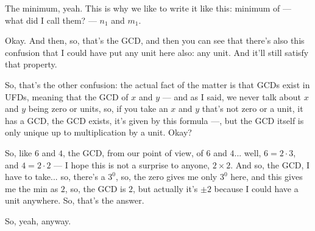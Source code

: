 \begin{speech}[01:24:48 - 01:25:34]
The minimum, yeah. This is why we like to write it like this: minimum of --- what did I call them? --- $n_1$ and $m_1$. 


Okay. And then, so, that's the GCD, and then you can see that there's also this confusion that I could have put any unit here also:  any unit. And it'll still satisfy that property.

So, that's the other confusion: the actual fact of the matter is that GCDs exist in UFDs,  meaning that the GCD of $x$ and $y$ --- and as I said, we never talk about $x$ and $y$ being zero or units, so, if you take an $x$ and $y$ that's not zero or a unit, it has a GCD, the GCD exists, it's given by this formula ---, but the GCD itself is only unique up to multiplication by a unit.  Okay?

So, like $6$ and $4$, the GCD, from our point of view, of $6$ and $4$... well, $6 = 2 \cdot 3$, and $4 = 2 \cdot 2$ --- I hope this is not a surprise to anyone, $2 \times 2$.  And so, the GCD, I have to take... so, there's a $3^0$, so, the zero gives me only $3^0$ here, and this gives me the min as $2$, so, the GCD is $2$, but actually it's $\pm 2$ because I could have a unit anywhere. So, that's the answer. 

So, yeah, anyway.
\end{speech}

